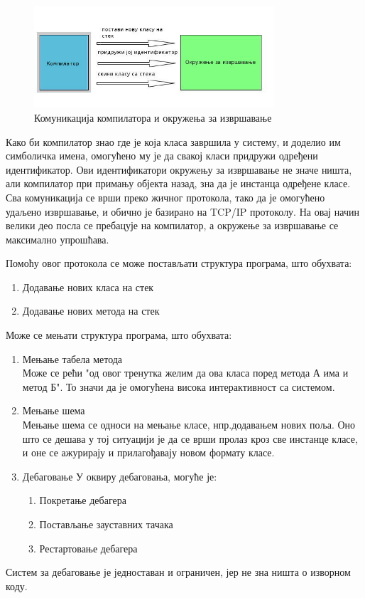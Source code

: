 \documentclass[12pt,oneside]{memoir}
\begin{document}
\begin{figure}[!ht]
  \centering
  \includegraphics[width=0.8\textwidth]{compiler.jpg}
  \caption{Комуникација компилатора и окружења за извршавање}
  \label{fig:komunikacija}
\end{figure}

Како би компилатор знао где је која класа завршила у систему, и доделио им симболичка имена, омогућено му је да свакој класи придружи одређени идентификатор. Ови идентификатори окружењу за извршавање не значе ништа, али компилатор при примању објекта назад, зна да је инстанца одређене класе.
Сва комуникација се врши преко жичног протокола, тако да је омогућено удаљено извршавање, и обично је базирано на TCP/IP протоколу. На овај начин велики део посла се пребацује на компилатор, а окружење за извршавање се максимално упрошћава.

Помоћу овог протокола се може постављати структура програма, што обухвата:
\begin{enumerate}
\item Додавање нових класа на стек
\item Додавање нових метода на стек
\end{enumerate}
Може се мењати структура програма, што обухвата:
\begin{enumerate}
\item Мењање табела метода\\
Може се рећи "од овог тренутка желим да ова класа поред метода А има и метод Б". То значи да је омогућена висока интерактивност са системом.
\item Мењање шема\\
Мењање шема се односи на мењање класе, нпр.додавањем нових поља. Оно што се дешава у тој ситуацији је да се врши пролаз кроз све инстанце класе, и оне се ажурирају и прилагођавају новом формату класе.
\item Дебаговање
У оквиру дебаговања, могуће је:
\begin{enumerate}
\item Покретање дебагера
\item Постављање зауставних тачака
\item Рестартовање дебагера
\end{enumerate}
\end{enumerate}
Систем за дебаговање је једноставан и ограничен, јер не зна ништа о изворном коду.
\end{document}
